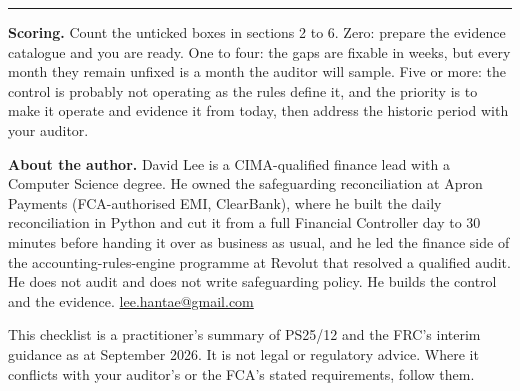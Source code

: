 \documentclass[a4paper,10.5pt]{article}
\begin{document}
\vspace{2mm}
\hrule
\vspace{2mm}
\textbf{Scoring.} Count the unticked boxes in sections 2 to 6. Zero: prepare the evidence catalogue and you are ready. One to four: the gaps are fixable in weeks, but every month they remain unfixed is a month the auditor will sample. Five or more: the control is probably not operating as the rules define it, and the priority is to make it operate and evidence it from today, then address the historic period with your auditor.

\textbf{About the author.} David Lee is a CIMA-qualified finance lead with a Computer Science degree. He owned the safeguarding reconciliation at Apron Payments (FCA-authorised EMI, ClearBank), where he built the daily reconciliation in Python and cut it from a full Financial Controller day to 30 minutes before handing it over as business as usual, and he led the finance side of the accounting-rules-engine programme at Revolut that resolved a qualified audit. He does not audit and does not write safeguarding policy. He builds the control and the evidence. \href{mailto:lee.hantae@gmail.com}{lee.hantae@gmail.com} \,\textperiodcentered\, 

{\footnotesize This checklist is a practitioner's summary of PS25/12 and the FRC's interim guidance as at September 2026. It is not legal or regulatory advice. Where it conflicts with your auditor's or the FCA's stated requirements, follow them.}
\end{document}
